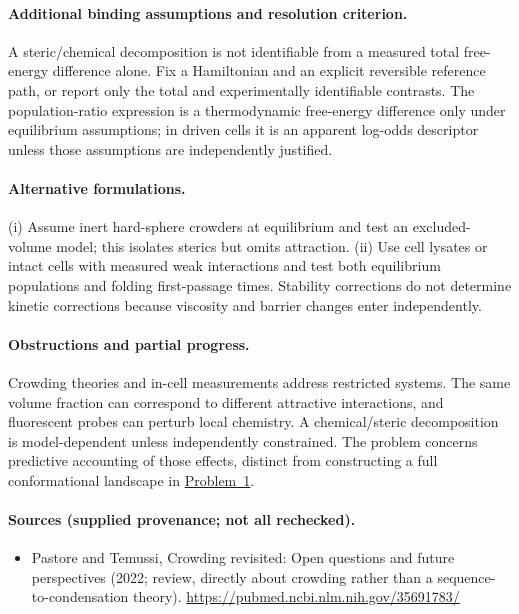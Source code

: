 \documentclass[11pt]{article}
\begin{document}
\paragraph{Additional binding assumptions and resolution criterion.} A steric/chemical decomposition is not identifiable from a measured total free-energy difference alone. Fix a Hamiltonian and an explicit reversible reference path, or report only the total and experimentally identifiable contrasts. The population-ratio expression is a thermodynamic free-energy difference only under equilibrium assumptions; in driven cells it is an apparent log-odds descriptor unless those assumptions are independently justified.

\paragraph{Alternative formulations.} (i) Assume inert hard-sphere crowders at equilibrium and test an excluded-volume model; this isolates sterics but omits attraction. (ii) Use cell lysates or intact cells with measured weak interactions and test both equilibrium populations and folding first-passage times. Stability corrections do not determine kinetic corrections because viscosity and barrier changes enter independently.
\paragraph{Obstructions and partial progress.} Crowding theories and in-cell measurements address restricted systems. The same volume fraction can correspond to different attractive interactions, and fluorescent probes can perturb local chemistry. A chemical/steric decomposition is model-dependent unless independently constrained. The problem concerns predictive accounting of those effects, distinct from constructing a full conformational landscape in \href{https://we-solve.github.io/problems/in-cell-protein-folding-landscape-58890e94/}{Problem~1}.
\paragraph{Sources (supplied provenance; not all rechecked).}
\begin{itemize}
\item Pastore and Temussi, Crowding revisited: Open questions and future perspectives (2022; review, directly about crowding rather than a sequence-to-condensation theory). \url{https://pubmed.ncbi.nlm.nih.gov/35691783/}
\end{itemize}
\end{document}
